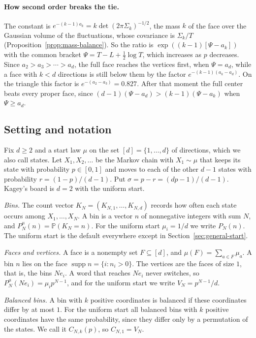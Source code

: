 \documentclass[11pt]{article}
\theoremstyle{definition}
\theoremstyle{remark}
\newcommand{\Prob}{\mathbb P}
\newcommand{\supp}{\operatorname{supp}}
\begin{document}
\paragraph{How second order breaks the tie.}
The constant is $e^{-(k-1)a_k}=k\det(2\pi\Sigma_k)^{-1/2}$, the mass $k$ of the
face over the Gaussian volume of the fluctuations, whose covariance is
$\Sigma_k/T$ (Proposition~\ref{prop:mass-balance}). So the ratio is
$\exp((k-1)[\Psi-a_k])$ with the common bracket $\Psi=T-L+\frac12\log T$, which
increases as $p$ decreases. Since $a_2>a_3>\cdots>a_d$, the full face reaches
the vertices first, when $\Psi=a_d$, while a face with $k<d$ directions is still
below them by the factor $e^{-(k-1)(a_k-a_d)}$. On the triangle this factor is
$e^{-(a_2-a_3)}=0.827$. After that moment the full center beats every proper
face, since $(d-1)(\Psi-a_d)>(k-1)(\Psi-a_k)$ when $\Psi\ge a_d$.

\subsection{Setting and notation}\label{sec:setting}

Fix $d\ge2$ and a start law $\mu$ on the set $[d]=\{1,\ldots,d\}$ of
directions, which we also call states. Let $X_1,X_2,\ldots$ be the Markov chain
with $X_1\sim\mu$ that keeps its state with probability $p\in[0,1]$ and moves to
each of the other $d-1$ states with probability $r=(1-p)/(d-1)$. Put
$\sigma=p-r=(dp-1)/(d-1)$. Kagey's board is $d=2$ with the uniform start.

\emph{Bins.} The count vector $K_N=(K_{N,1},\ldots,K_{N,d})$ records how often
each state occurs among $X_1,\ldots,X_N$. A bin is a vector $n$ of nonnegative
integers with sum $N$, and $P^\mu_N(n)=\Prob(K_N=n)$. For the uniform start
$\mu_i=1/d$ we write $P_N(n)$. The uniform start is the default everywhere
except in Section~\ref{sec:general-start}.

\emph{Faces and vertices.} A face is a nonempty set $F\subseteq[d]$, and
$\mu(F)=\sum_{a\in F}\mu_a$. A bin $n$ lies on the face
$\supp n=\{i:n_i>0\}$. The vertices are the faces of size $1$, that is, the
bins $Ne_i$. A word that reaches $Ne_i$ never switches, so
$P^\mu_N(Ne_i)=\mu_ip^{N-1}$, and for the uniform start we write
$V_N=p^{N-1}/d$.

\emph{Balanced bins.} A bin with $k$ positive coordinates is balanced if these
coordinates differ by at most $1$. For the uniform start all balanced bins with
$k$ positive coordinates have the same probability, since they differ only by a
permutation of the states. We call it $C_{N,k}(p)$, so $C_{N,1}=V_N$.
\end{document}

